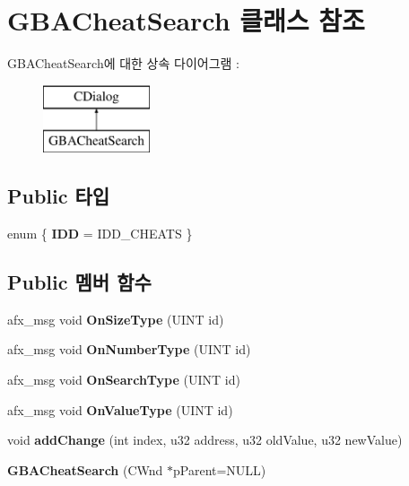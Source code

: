 \hypertarget{class_g_b_a_cheat_search}{}\section{G\+B\+A\+Cheat\+Search 클래스 참조}
\label{class_g_b_a_cheat_search}
G\+B\+A\+Cheat\+Search에 대한 상속 다이어그램 \+: \begin{figure}[H]
\begin{center}
\leavevmode
\includegraphics[height=2.000000cm]{class_g_b_a_cheat_search}
\end{center}
\end{figure}
\subsection*{Public 타입}
\begin{DoxyCompactItemize}
\item 
\mbox{\label{class_g_b_a_cheat_search_aad94fa4948a9a182e3d5a15c5d0bf02f}} 
enum \{ {\bfseries I\+DD} = I\+D\+D\+\_\+\+C\+H\+E\+A\+TS
 \}
\end{DoxyCompactItemize}
\subsection*{Public 멤버 함수}
\begin{DoxyCompactItemize}
\item 
\mbox{\label{class_g_b_a_cheat_search_a3a8aab04dae339242636eaa50b5c3bff}} 
afx\+\_\+msg void {\bfseries On\+Size\+Type} (U\+I\+NT id)
\item 
\mbox{\label{class_g_b_a_cheat_search_ad75552e2edb79b66761e42965221268c}} 
afx\+\_\+msg void {\bfseries On\+Number\+Type} (U\+I\+NT id)
\item 
\mbox{\label{class_g_b_a_cheat_search_a58e09cf82509ff9b68f35d3e3e780c0a}} 
afx\+\_\+msg void {\bfseries On\+Search\+Type} (U\+I\+NT id)
\item 
\mbox{\label{class_g_b_a_cheat_search_a6cafcf45420b6af926e47a70f0f9da02}} 
afx\+\_\+msg void {\bfseries On\+Value\+Type} (U\+I\+NT id)
\item 
\mbox{\label{class_g_b_a_cheat_search_afefabf8fcfe952b062d260152c595415}} 
void {\bfseries add\+Change} (int index, u32 address, u32 old\+Value, u32 new\+Value)
\item 
\mbox{\label{class_g_b_a_cheat_search_aa59bfbdaba09776ce59a01770bb4e756}} 
{\bfseries G\+B\+A\+Cheat\+Search} (C\+Wnd $\ast$p\+Parent=N\+U\+LL)
\end{DoxyCompactItemize}
